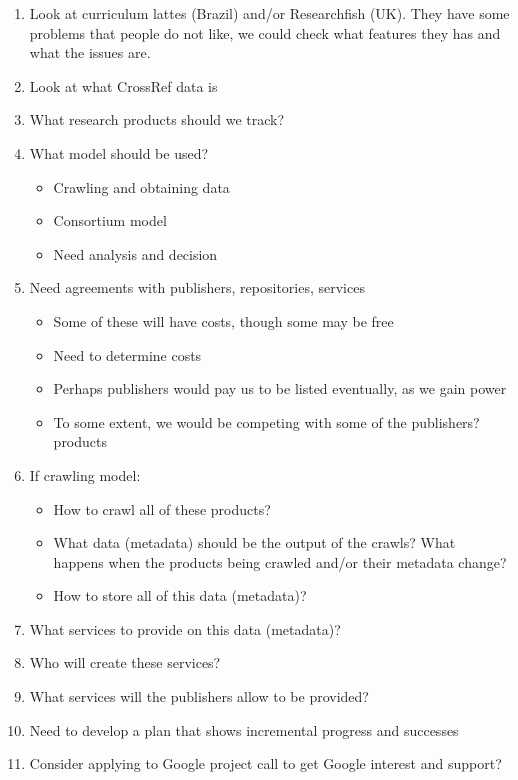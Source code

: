 \begin{enumerate}
\item Look at curriculum lattes (Brazil) and/or Researchfish (UK).  They have some problems that people do not like, we could check what features they has and what the issues are.

\item Look at what CrossRef data is

\item What research products should we track?

\item What model should be used?
\begin{itemize}
    \item Crawling and obtaining data
    \item Consortium model
    \item Need analysis and decision
\end{itemize}

\item Need agreements with publishers, repositories, services
\begin{itemize}
    \item Some of these will have costs, though some may be free
    \item Need to determine costs
    \item Perhaps publishers would pay us to be listed eventually, as we gain power
    \item To some extent, we would be competing with some of the publishers? products
\end{itemize}

\item If crawling model:
\begin{itemize}
    \item How to crawl all of these products?
    \item What data (metadata) should be the output of the crawls? What happens when the products being crawled and/or their metadata change?
    \item How to store all of this data (metadata)?
\end{itemize}

\item What services to provide on this data (metadata)?

\item Who will create these services?

\item What services will the publishers allow to be provided?

\item Need to develop a plan that shows incremental progress and successes

\item Consider applying to Google project call to get Google interest and support?
\end{enumerate}


